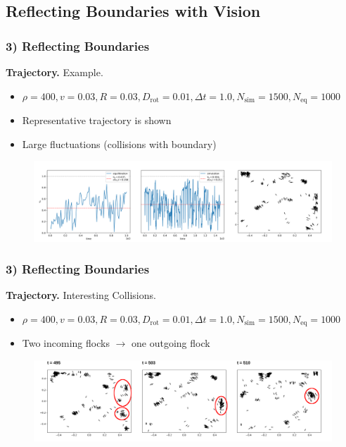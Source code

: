 \subsection{Reflecting Boundaries with Vision}

\begin{frame}
	\frametitle{3) Reflecting Boundaries}
	\textbf{Trajectory.} Example.
	\begin{itemize}
	    \item $\rho = 400, v = 0.03, R = 0.03, D_{\text{rot}} = 0.01, \Delta t = 1.0, N_{\text{sim}} = 1500, N_{\text{eq}} = 1000$
	    \item Representative trajectory is shown
	    \item Large fluctuations (collisions with boundary)
	\end{itemize}
	\begin{figure}[H]
  		\includegraphics[width=\textwidth]{images/chapter3/flocks_N_20_L_1.000000_v_0.030000_R_0.010000_D_0.010000.png} 
	\end{figure}
\end{frame}

\begin{frame}
	\frametitle{3) Reflecting Boundaries}
	\textbf{Trajectory.} Interesting Collisions.
	\begin{itemize}
	    \item $\rho = 400, v = 0.03,  R = 0.03, D_{\text{rot}} = 0.01, \Delta t = 1.0, N_{\text{sim}} = 1500, N_{\text{eq}} = 1000$
	    \item Two incoming flocks $\rightarrow$ one outgoing flock 
	\end{itemize}
	\begin{figure}[H]
  		\includegraphics[width=\textwidth]{images/chapter3/collision_N_20_L_1.000000_v_0.030000_R_0.030000_D_0.010000.png} 
	\end{figure}
\end{frame}

